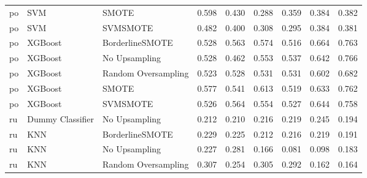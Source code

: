 \begin{tabular}{lllllllll}
      po &                          SVM &               SMOTE & 0.598 &                     0.430 &                 0.288 &                  0.359 &                                   0.384 &     0.382 \\
      po &                          SVM &            SVMSMOTE & 0.482 &                     0.400 &                 0.308 &                  0.295 &                                   0.384 &     0.381 \\
      po &                      XGBoost &     BorderlineSMOTE & 0.528 &                     0.563 &                 0.574 &                  0.516 &                                   0.664 &     0.763 \\
      po &                      XGBoost &       No Upsampling & 0.528 &                     0.462 &                 0.553 &                  0.537 &                                   0.642 &     0.766 \\
      po &                      XGBoost & Random Oversampling & 0.523 &                     0.528 &                 0.531 &                  0.531 &                                   0.602 &     0.682 \\
      po &                      XGBoost &               SMOTE & 0.577 &                     0.541 &                 0.613 &                  0.519 &                                   0.633 &     0.762 \\
      po &                      XGBoost &            SVMSMOTE & 0.526 &                     0.564 &                 0.554 &                  0.527 &                                   0.644 &     0.758 \\
      ru &             Dummy Classifier &       No Upsampling & 0.212 &                     0.210 &                 0.216 &                  0.219 &                                   0.245 &     0.194 \\
      ru &                          KNN &     BorderlineSMOTE & 0.229 &                     0.225 &                 0.212 &                  0.216 &                                   0.219 &     0.191 \\
      ru &                          KNN &       No Upsampling & 0.227 &                     0.281 &                 0.166 &                  0.081 &                                   0.098 &     0.183 \\
      ru &                          KNN & Random Oversampling & 0.307 &                     0.254 &                 0.305 &                  0.292 &                                   0.162 &     0.164 \\

\end{tabular}
